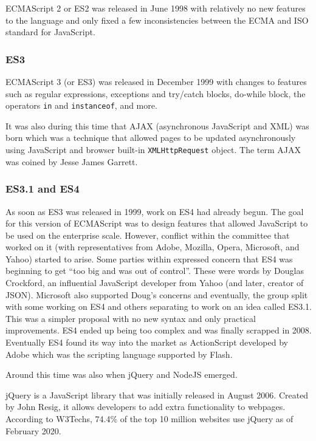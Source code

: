 \documentclass{article}
\newcommand{\jsin}[1]{\texttt{#1}}
\begin{document}
    ECMAScript 2 or ES2 was released in June 1998 with relatively no new
    features to the language and only fixed a few inconsistencies between the
    ECMA and ISO standard for JavaScript.

    \subsubsection{ES3}
    ECMAScript 3 (or ES3) was released in December 1999 with changes to features
    such as regular expressions, exceptions and try/catch blocks,
    do-while block, the operators \jsin{in} and \jsin{instanceof}, and more.

    It was also during this time that AJAX (asynchronous JavaScript and XML) was
    born which was a technique that allowed pages to be updated asynchronously
    using JavaScript and browser built-in \jsin{XMLHttpRequest} object. The term AJAX
    was coined by Jesse James Garrett.

    \subsubsection{ES3.1 and ES4}
    As soon as ES3 was released in 1999, work on ES4 had already begun. The goal
    for this version of ECMAScript was to design features that allowed
    JavaScript to be used on the enterprise scale. However, conflict within the
    committee that worked on it (with representatives from Adobe, Mozilla,
    Opera, Microsoft, and Yahoo) started to arise. Some parties within expressed
    concern that ES4 was beginning to get “too big and was out of control”.
    These were words by Douglas Crockford, an influential JavaScript developer
    from Yahoo (and later, creator of JSON). Microsoft also supported Doug’s 
    concerns and eventually, the group split with some working on ES4 and others
    separating to work on an idea called ES3.1. This was a simpler proposal with 
    no new syntax and only practical improvements. ES4 ended up being too complex 
    and was finally scrapped in 2008. Eventually ES4 found its way into the market 
    as ActionScript developed by Adobe which was the scripting language supported by 
    Flash.

    Around this time was also when jQuery and NodeJS emerged.
    
    jQuery is a JavaScript library that was initially released in August 2006.
    Created by John Resig, it allows developers to add extra functionality to
    webpages. According to W3Techs, 74.4\% of the top 10 million websites use
    jQuery as of February 2020.
\end{document}
